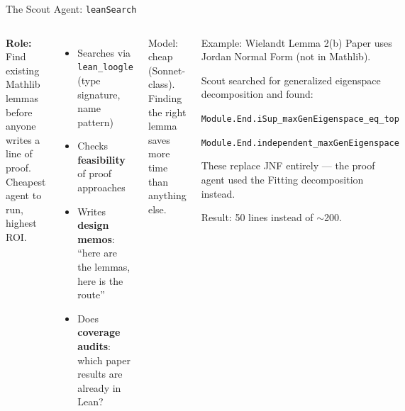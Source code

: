 \documentclass[aspectratio=169,10pt]{beamer}
\begin{document}
\begin{frame}{The Scout Agent: \texttt{leanSearch}}
    \begin{columns}[T]
        \textcolor{leanblue}{\textbf{Role:}} Find existing Mathlib lemmas before anyone writes a line of proof. Cheapest agent to run, highest ROI.
        \vspace{0.3em}
        \begin{itemize}
            \item Searches via \texttt{lean\_loogle} {\scriptsize(type signature, name pattern)}
            \item Checks \textbf{feasibility} of proof approaches
            \item Writes \textbf{design memos}: ``here are the lemmas, here is the route''
            \item Does \textbf{coverage audits}: which paper results are already in Lean?
        \end{itemize}
        \vspace{0.3em}
        \textcolor{dimwhite}{\footnotesize Model: cheap (Sonnet-class). Finding the right lemma saves more time than anything else.}
        \begin{block}{\footnotesize Example: Wielandt Lemma 2(b)}
          Paper uses Jordan Normal Form (not in Mathlib).
          \vspace{0.2em}

          Scout searched for generalized eigenspace decomposition and found:
          \vspace{0.2em}

          {\tiny\texttt{Module.End.iSup\_maxGenEigenspace\_eq\_top}}
          \vspace{0.1em}

          {\tiny\texttt{Module.End.independent\_maxGenEigenspace}}
          \vspace{0.2em}

          These replace JNF entirely --- the proof agent used the Fitting decomposition instead.
          \vspace{0.2em}

          \textcolor{leangreen}{Result: 50 lines instead of $\sim$200.}
        \end{block}
    \end{columns}
\end{frame}
\end{document}
